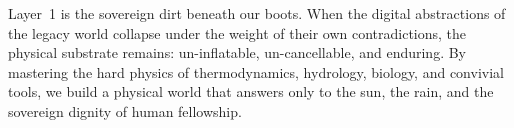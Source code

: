 Layer~1 is the sovereign dirt beneath our boots. When the digital abstractions of the legacy world collapse under the weight of their own contradictions, the physical substrate remains: un-inflatable, un-cancellable, and enduring. By mastering the hard physics of thermodynamics, hydrology, biology, and convivial tools, we build a physical world that answers only to the sun, the rain, and the sovereign dignity of human fellowship.
